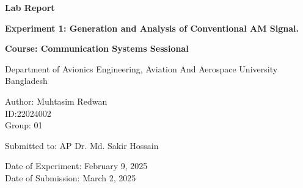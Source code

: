 \begin{titlepage}
    \centering
    
    \Huge
    \textbf{Lab Report}
    
    \vspace{0.5in}
    \LARGE
    \textbf{Experiment 1: Generation and Analysis of Conventional AM Signal.}
    
    \vspace{1in}
    
    \textbf{Course: Communication Systems Sessional}

    \vspace{1in}
    
    Department of Avionics Engineering, Aviation And Aerospace University Bangladesh\\
    
    \vspace{0.5in}
    
    Author: Muhtasim Redwan \\
    ID:22024002\\
    Group: 01\\
    
    \vspace{0.5in}
    
    Submitted to: AP Dr. Md. Sakir Hossain \\
    
    \vfill
    
    \Large
    Date of Experiment: February 9, 2025\\
    Date of Submission: March 2, 2025\\
    
\end{titlepage}